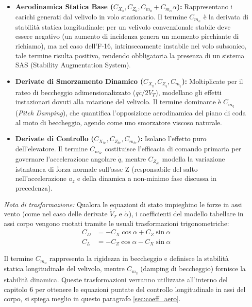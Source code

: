 \begin{itemize}
	\item \textbf{Aerodinamica Statica Base ($C_{X_0}, C_{Z_0}, C_{m_0} + C_{m_\alpha}\alpha$):} Rappresentano i carichi generati dal velivolo in volo stazionario. Il termine $C_{m_\alpha}$ è la derivata di stabilità statica longitudinale: per un velivolo convenzionale stabile deve essere negativo (un aumento di incidenza genera un momento picchiante di richiamo), ma nel caso dell'F-16, intrinsecamente instabile nel volo subsonico, tale termine risulta positivo, rendendo obbligatoria la presenza di un sistema SAS (Stability Augmentation System).
	
	\item \textbf{Derivate di Smorzamento Dinamico ($C_{X_q}, C_{Z_q}, C_{m_q}$):} Moltiplicate per il rateo di beccheggio adimensionalizzato ($q \bar{c}/2 V_T$), modellano gli effetti instazionari dovuti alla rotazione del velivolo. Il termine dominante è $C_{m_q}$ (\textit{Pitch Damping}), che quantifica l'opposizione aerodinamica del piano di coda al moto di beccheggio, agendo come uno smorzatore viscoso naturale.
	
	\item \textbf{Derivate di Controllo ($C_{X_{\delta e}}, C_{Z_{\delta e}}, C_{m_{\delta e}}$):} Isolano l'effetto puro dell'elevatore. Il termine $C_{m_{\delta e}}$ costituisce l'efficacia di comando primaria per governare l'accelerazione angolare $\dot{q}$, mentre $C_{Z_{\delta e}}$ modella la variazione istantanea di forza normale sull'asse Z (responsabile del salto nell'accelerazione $a_z$ e della dinamica a non-minimo fase discussa in precedenza).
\end{itemize}

\textit{Nota di trasformazione:} Qualora le equazioni di stato impieghino le forze in assi vento (come nel caso delle derivate $\dot{V}_T$ e $\dot{\alpha}$), i coefficienti del modello tabellare in assi corpo vengono ruotati tramite le usuali trasformazioni trigonometriche:
\begin{align*}
	C_D &= -C_X \cos\alpha + C_Z \sin\alpha \\
	C_L &= -C_Z \cos\alpha - C_X \sin\alpha
\end{align*}

Il termine $C_{m_\alpha}$ rappresenta la rigidezza in beccheggio e definisce la stabilità statica longitudinale del velivolo, mentre $C_{m_q}$ (damping di beccheggio) fornisce la stabilità dinamica. Queste trasformazioni verranno utilizzate all'interno del capitolo 6 per ottenere le equazioni puntate del controllo longitudinale in assi del corpo, si spiega meglio in questo paragrafo \ref{sec:coeff_aero}.

